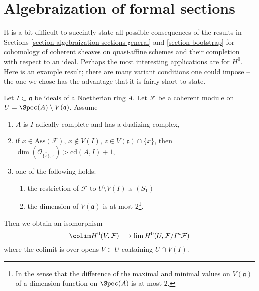 \section{Algebraization of formal sections}
\label{section-algebraization-sections-coherent}

\noindent
It is a bit difficult to succintly state all possible
consequences of the results in
Sections \ref{section-algebraization-sections-general} and
\ref{section-bootstrap}
for cohomology of coherent sheaves on quasi-affine schemes
and their completion with respect to an ideal.
Perhaps the most interesting applications are for $H^0$.
Here is an example result; there are many variant conditions
one could impose -- the one we chose has the advantage that
it is fairly short to state.

\begin{proposition}
\label{proposition-application-H0}
Let $I \subset \mathfrak a$ be ideals of a Noetherian ring $A$.
Let $\mathcal{F}$ be a coherent module on
$U = \Spec(A) \setminus V(\mathfrak a)$.
Assume
\begin{enumerate}
\item $A$ is $I$-adically complete and has a dualizing complex,
\item if $x \in \text{Ass}(\mathcal{F})$, $x \not \in V(I)$,
$z \in V(\mathfrak a) \cap \overline{\{x\}}$, then
$\dim(\mathcal{O}_{\overline{\{x\}}, z}) > \text{cd}(A, I) + 1$,
\item one of the following holds:
\begin{enumerate}
\item the restriction of $\mathcal{F}$ to $U \setminus V(I)$ is $(S_1)$
\item the dimension of $V(\mathfrak a)$ is at most $2$\footnote{In
the sense that the difference of the maximal and minimal values
on $V(\mathfrak a)$ of a dimension function on $\Spec(A)$ is at most $2$.}.
\end{enumerate}
\end{enumerate}
Then we obtain an isomorphism
$$
\colim H^0(V, \mathcal{F})
\longrightarrow
\lim H^0(U, \mathcal{F}/I^n\mathcal{F})
$$
where the colimit is over opens $V \subset U$ containing $U \cap V(I)$.
\end{proposition}


